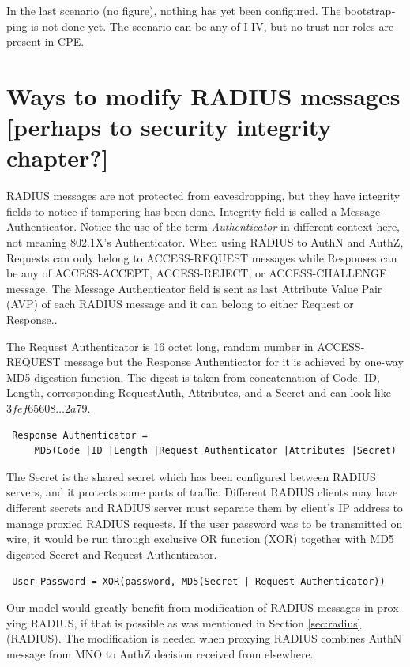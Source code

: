 \documentclass[12pt,a4paper,english]{tutthesis}
\begin{document}
\begin{otherlanguage}{english}
In the last scenario (no figure), nothing has yet been configured. The bootstrapping
is not done yet. The scenario can be any of I-IV, but no trust nor roles are present in CPE.
\section{Ways to modify RADIUS messages [perhaps to security integrity chapter?]}
\label{sec-4-7}
\label{sec:radius-macs}
RADIUS messages are not protected from eavesdropping, but they have
integrity fields to notice if tampering has been done.  
Integrity field is called a Message Authenticator.
Notice the use of the term \emph{Authenticator} in different context here, not
meaning 802.1X's Authenticator.
When using RADIUS to AuthN and AuthZ, Requests can only belong to ACCESS-REQUEST messages while
Responses can be any of ACCESS-ACCEPT, ACCESS-REJECT, or ACCESS-CHALLENGE message.
The Message Authenticator field is sent as last Attribute Value Pair (AVP)
of each RADIUS message and it can belong 
to either Request or Response.\cite[p.20]{radiusbook}.

The Request Authenticator is 16 octet long, random number in
ACCESS-REQUEST message but the Response Authenticator for it is achieved
by one-way MD5 digestion function. 
The digest is taken from concatenation of Code, ID, Length, corresponding
Request\-Auth, Attributes, and a Secret and can look like 
$3fef65608\ldots 2a79$. 
\begin{verbatim}
 Response Authenticator = 
     MD5(Code |ID |Length |Request Authenticator |Attributes |Secret)
\end{verbatim}
The Secret is the shared secret which has been configured between RADIUS servers,
and it protects some parts of traffic. 
Different RADIUS clients may have different
secrets and RADIUS server must separate them by client's IP address to
manage proxied RADIUS requests\cite{radiusbook}.
If the user password was to be transmitted on wire, it would be run
through exclusive OR function (XOR) together with MD5 digested Secret
and Request
Authenticator.
\begin{center}
{\tt 
User-Password = XOR(password, MD5(Secret | Request Authenticator))}
\end{center}



Our model would greatly benefit from modification of RADIUS messages in proxying
RADIUS, if that is possible as was mentioned in Section \ref{sec:radius}(RADIUS).
The modification is needed when proxying RADIUS combines AuthN message
from MNO to AuthZ decision received from elsewhere.







\end{otherlanguage}
\end{document}
